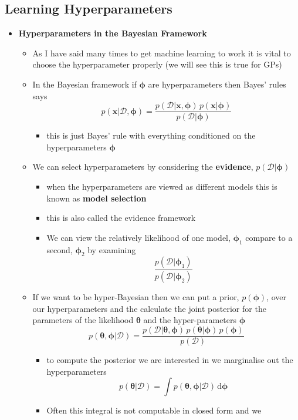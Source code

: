 \documentclass[11pt]{article}
\newcommand{\dd}{\mathrm{d}}
\begin{document}
\subsection{Learning Hyperparameters}
\label{sec:orgbc635cc}
\begin{itemize}
\item \textbf{Hyperparameters in the Bayesian Framework}
\begin{itemize}
\item As I have said many times to get machine learning to work it is
vital to choose the hyperparameter properly (we will see this
is true for GPs)
\item In the Bayesian framework if \(\bm{\phi}\) are hyperparameters
then Bayes' rules says
$$ p(\bm{x}|\mathcal{D},\bm{\phi}) =
       \frac{p(\mathcal{D}|\bm{x},\bm{\phi}) \,
       p(\bm{x}|\bm{\phi})}{p(\mathcal{D}|\bm{\phi}) } $$
\begin{itemize}
\item this is just Bayes' rule with everything conditioned on the
hyperparameters \(\bm{\phi}\)
\end{itemize}
\item We can select hyperparameters by considering the \textbf{evidence},
\(p(\mathcal{D}|\bm{\phi})\)
\begin{itemize}
\item when the hyperparameters are viewed as different models this is
known as \textbf{model selection}
\item this is also called the evidence framework
\item We can view the relatively likelihood of one model,
\(\bm{\phi}_1\) compare to a second, \(\bm{\phi}_2\) by examining
$$ \frac{p(\mathcal{D}|\bm{\phi}_1)}{p(\mathcal{D}|\bm{\phi}_2)} $$
\end{itemize}
\item If we want to be hyper-Bayesian then we can put a prior,
\(p(\bm{\phi})\), over our hyperparameters and the calculate the
joint posterior for the parameters of the likelihood
\(\bm{\theta}\) and the hyper-parameters \(\bm{\phi}\)
$$ p(\bm{\theta},\bm{\phi}| \mathcal{D}) = \frac{p(\mathcal{D}|
       \bm{\theta},\bm{\phi}) \, p(\bm{\theta}|\bm{\phi}) \, p(\bm{\phi})}{
       p(\mathcal{D})} $$
\begin{itemize}
\item to compute the posterior we are interested in we marginalise
out the hyperparameters
$$ p(\bm{\theta}|\mathcal{D}) = \int
         p(\bm{\theta},\bm{\phi}| \mathcal{D}) \,\dd \bm{\phi} $$
\item Often this integral is not computable in closed form and we

\end{itemize}
\end{itemize}
\end{itemize}
\end{document}
